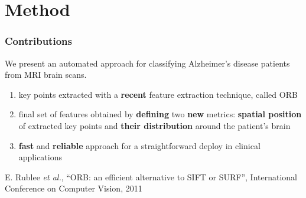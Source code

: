 \section{Method}

\begin{frame}
	\frametitle{Contributions}
	
	\Large
	
	\vspace{0.8cm}
	
	We present an automated approach for classifying Alzheimer's disease patients from MRI brain scans.
	
	\begin{enumerate}
		\item key points extracted with a \textbf{recent} feature extraction technique, called ORB
			  \cite{Rublee11}
		\item final set of features obtained by \textbf{defining} two \textbf{new} metrics:
			  \textbf{spatial position} of extracted key points and \textbf{their distribution} around
			  the patient's brain
		\item \textbf{fast} and \textbf{reliable} approach for a straightforward deploy in clinical
			  applications
	\end{enumerate}
	
	\vspace{0.58cm}
	
	\tiny
	
	\cite{Rublee11} E. Rublee \emph{et al.}, ``ORB: an efficient alternative to SIFT or SURF'',
	International Conference on Computer Vision, 2011
\end{frame}

